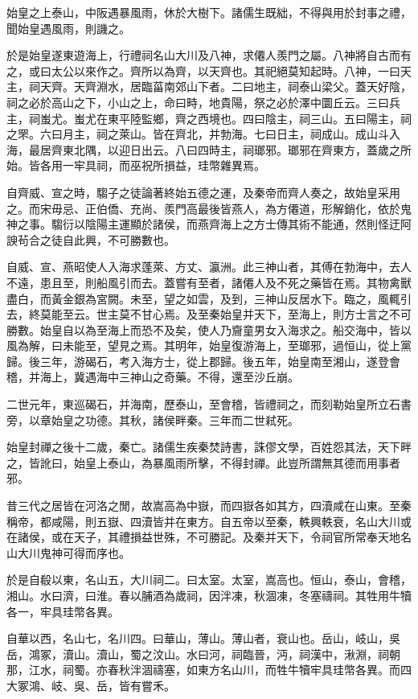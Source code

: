 始皇之上泰山，中阪遇暴風雨，休於大樹下。諸儒生既絀，不得與用於封事之禮，聞始皇遇風雨，則譏之。

於是始皇遂東遊海上，行禮祠名山大川及八神，求僊人羨門之屬。八神將自古而有之，或曰太公以來作之。齊所以為齊，以天齊也。其祀絕莫知起時。八神，一曰天主，祠天齊。天齊淵水，居臨菑南郊山下者。二曰地主，祠泰山梁父。蓋天好陰，祠之必於高山之下，小山之上，命曰畤，地貴陽，祭之必於澤中圜丘云。三曰兵主，祠蚩尤。蚩尤在東平陸監鄉，齊之西境也。四曰陰主，祠三山。五曰陽主，祠之罘。六曰月主，祠之萊山。皆在齊北，并勃海。七曰日主，祠成山。成山斗入海，最居齊東北隅，以迎日出云。八曰四時主，祠瑯邪。瑯邪在齊東方，蓋歲之所始。皆各用一牢具祠，而巫祝所損益，珪幣雜異焉。

自齊威、宣之時，騶子之徒論著終始五德之運，及秦帝而齊人奏之，故始皇采用之。而宋毋忌、正伯僑、充尚、羨門高最後皆燕人，為方僊道，形解銷化，依於鬼神之事。騶衍以陰陽主運顯於諸侯，而燕齊海上之方士傳其術不能通，然則怪迂阿諛茍合之徒自此興，不可勝數也。

自威、宣、燕昭使人入海求蓬萊、方丈、瀛洲。此三神山者，其傅在勃海中，去人不遠，患且至，則船風引而去。蓋嘗有至者，諸僊人及不死之藥皆在焉。其物禽獸盡白，而黃金銀為宮闕。未至，望之如雲，及到，三神山反居水下。臨之，風輒引去，終莫能至云。世主莫不甘心焉。及至秦始皇并天下，至海上，則方士言之不可勝數。始皇自以為至海上而恐不及矣，使人乃齎童男女入海求之。船交海中，皆以風為解，曰未能至，望見之焉。其明年，始皇復游海上，至瑯邪，過恒山，從上黨歸。後三年，游碣石，考入海方士，從上郡歸。後五年，始皇南至湘山，遂登會稽，并海上，冀遇海中三神山之奇藥。不得，還至沙丘崩。

二世元年，東巡碣石，并海南，歷泰山，至會稽，皆禮祠之，而刻勒始皇所立石書旁，以章始皇之功德。其秋，諸侯畔秦。三年而二世弒死。

始皇封禪之後十二歲，秦亡。諸儒生疾秦焚詩書，誅僇文學，百姓怨其法，天下畔之，皆訛曰，始皇上泰山，為暴風雨所擊，不得封禪。此豈所謂無其德而用事者邪。

昔三代之居皆在河洛之閒，故嵩高為中嶽，而四嶽各如其方，四瀆咸在山東。至秦稱帝，都咸陽，則五嶽、四瀆皆并在東方。自五帝以至秦，軼興軼衰，名山大川或在諸侯，或在天子，其禮損益世殊，不可勝記。及秦并天下，令祠官所常奉天地名山大川鬼神可得而序也。

於是自殽以東，名山五，大川祠二。曰太室。太室，嵩高也。恒山，泰山，會稽，湘山。水曰濟，曰淮。春以脯酒為歲祠，因泮凍，秋涸凍，冬塞禱祠。其牲用牛犢各一，牢具珪幣各異。

自華以西，名山七，名川四。曰華山，薄山。薄山者，衰山也。岳山，岐山，吳岳，鴻冢，瀆山。瀆山，蜀之汶山。水曰河，祠臨晉，沔，祠漢中，湫淵，祠朝那，江水，祠蜀。亦春秋泮涸禱塞，如東方名山川，而牲牛犢牢具珪幣各異。而四大冢鴻、岐、吳、岳，皆有嘗禾。

